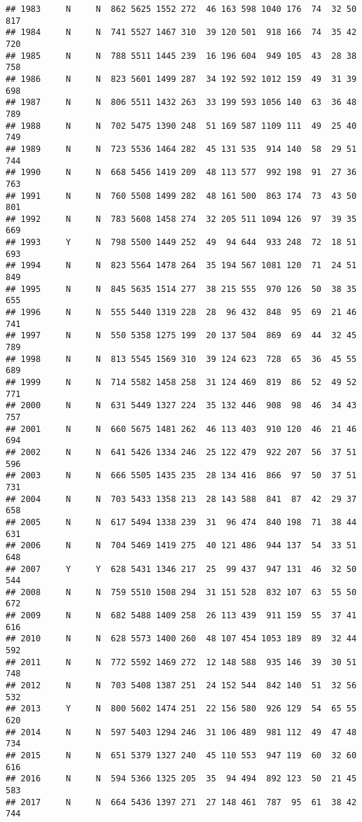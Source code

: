 \documentclass[]{article}
\begin{document}
\begin{verbatim}
## 1983     N     N  862 5625 1552 272  46 163 598 1040 176  74  32 50  817
## 1984     N     N  741 5527 1467 310  39 120 501  918 166  74  35 42  720
## 1985     N     N  788 5511 1445 239  16 196 604  949 105  43  28 38  758
## 1986     N     N  823 5601 1499 287  34 192 592 1012 159  49  31 39  698
## 1987     N     N  806 5511 1432 263  33 199 593 1056 140  63  36 48  789
## 1988     N     N  702 5475 1390 248  51 169 587 1109 111  49  25 40  749
## 1989     N     N  723 5536 1464 282  45 131 535  914 140  58  29 51  744
## 1990     N     N  668 5456 1419 209  48 113 577  992 198  91  27 36  763
## 1991     N     N  760 5508 1499 282  48 161 500  863 174  73  43 50  801
## 1992     N     N  783 5608 1458 274  32 205 511 1094 126  97  39 35  669
## 1993     Y     N  798 5500 1449 252  49  94 644  933 248  72  18 51  693
## 1994     N     N  823 5564 1478 264  35 194 567 1081 120  71  24 51  849
## 1995     N     N  845 5635 1514 277  38 215 555  970 126  50  38 35  655
## 1996     N     N  555 5440 1319 228  28  96 432  848  95  69  21 46  741
## 1997     N     N  550 5358 1275 199  20 137 504  869  69  44  32 45  789
## 1998     N     N  813 5545 1569 310  39 124 623  728  65  36  45 55  689
## 1999     N     N  714 5582 1458 258  31 124 469  819  86  52  49 52  771
## 2000     N     N  631 5449 1327 224  35 132 446  908  98  46  34 43  757
## 2001     N     N  660 5675 1481 262  46 113 403  910 120  46  21 46  694
## 2002     N     N  641 5426 1334 246  25 122 479  922 207  56  37 51  596
## 2003     N     N  666 5505 1435 235  28 134 416  866  97  50  37 51  731
## 2004     N     N  703 5433 1358 213  28 143 588  841  87  42  29 37  658
## 2005     N     N  617 5494 1338 239  31  96 474  840 198  71  38 44  631
## 2006     N     N  704 5469 1419 275  40 121 486  944 137  54  33 51  648
## 2007     Y     Y  628 5431 1346 217  25  99 437  947 131  46  32 50  544
## 2008     N     N  759 5510 1508 294  31 151 528  832 107  63  55 50  672
## 2009     N     N  682 5488 1409 258  26 113 439  911 159  55  37 41  616
## 2010     N     N  628 5573 1400 260  48 107 454 1053 189  89  32 44  592
## 2011     N     N  772 5592 1469 272  12 148 588  935 146  39  30 51  748
## 2012     N     N  703 5408 1387 251  24 152 544  842 140  51  32 56  532
## 2013     Y     N  800 5602 1474 251  22 156 580  926 129  54  65 55  620
## 2014     N     N  597 5403 1294 246  31 106 489  981 112  49  47 48  734
## 2015     N     N  651 5379 1327 240  45 110 553  947 119  60  32 60  616
## 2016     N     N  594 5366 1325 205  35  94 494  892 123  50  21 45  583
## 2017     N     N  664 5436 1397 271  27 148 461  787  95  61  38 42  744

\end{verbatim}
\end{document}
